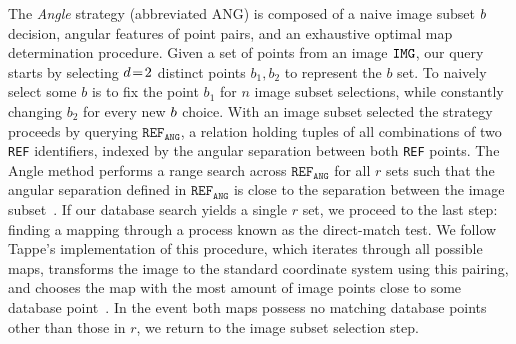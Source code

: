 The \textit{Angle} strategy (abbreviated ANG) is composed of a naive image subset $b$ decision, angular features of point pairs, and an exhaustive optimal map determination procedure.
Given a set of points from an image $\texttt{IMG}$, our query starts by selecting $d
\!=\! 2$ distinct points $b_1, b_2$ to represent the $b$ set.
To naively select some $b$ is to fix the point $b_1$ for $n$ image subset selections, while constantly changing $b_2$ for every new $b$ choice.
With an image subset selected the strategy proceeds by querying $\texttt{REF}_\texttt{ANG}$, a relation holding tuples of all combinations of two \texttt{REF} identifiers, indexed by the angular separation between both \texttt{REF} points.
The Angle method performs a range search across $\texttt{REF}_\texttt{ANG}$ for all $r$ sets such that the angular separation defined in $\texttt{REF}_\texttt{ANG}$ is close to the separation between the image subset~\cite{bratt:analysisStarIdentification}.
If our database search yields a single $r$ set, we proceed to the last step: finding a mapping through a process known as the direct-match test.
We follow Tappe's implementation of this procedure, which iterates through all possible maps, transforms the image to the standard coordinate system using this pairing, and chooses the map with the most amount of image points close to some database point~\cite{tappe:starTrackerDevelopment,needelman:stellarAttitudeAcquisition}.
In the event both maps possess no matching database points other than those in $r$, we return to the image subset selection step.



